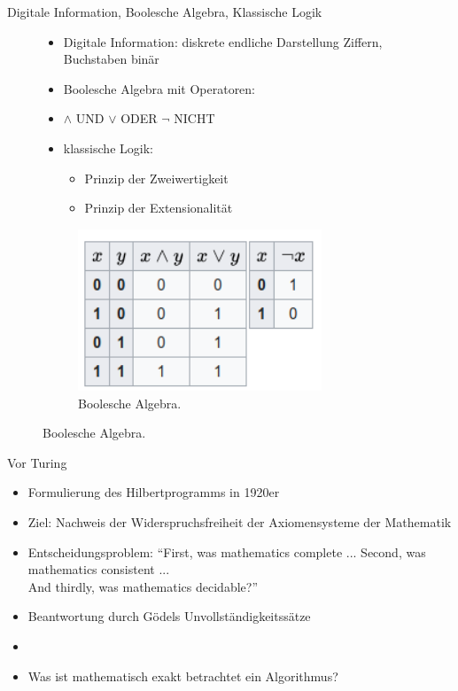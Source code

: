 \documentclass[aspectratio=1610, 9pt]{beamer}
\begin{document}
\begin{frame}{Digitale Information, Boolesche Algebra, Klassische Logik}
  \begin{figure}
    \begin{minipage}{0.7\textwidth}
      \begin{itemize}
        \item Digitale Information: diskrete endliche Darstellung \rightarrow Ziffern, Buchstaben \rightarrow binär
        \item Boolesche Algebra mit Operatoren:
        \item[] $\land$ UND $\lor$ ODER $\lnot$ NICHT
        \item klassische Logik:
        \begin{itemize}
          \item Prinzip der Zweiwertigkeit
          \item Prinzip der Extensionalität
        \end{itemize}
      \end{itemize}
    \end{minipage}
    \hfill
    \begin{minipage}{0.28\textwidth}
      \begin{figure}
        \includegraphics[width=0.8\textwidth]{images/bool.png}
        \caption{Boolesche Algebra.}
      \end{figure}
    \end{minipage}
  \end{figure}
\end{frame}

\begin{frame}{Vor Turing}
  \begin{itemize}
    \item Formulierung des Hilbertprogramms in 1920er
    \item Ziel: Nachweis der Widerspruchsfreiheit der Axiomensysteme der Mathematik
    \item[\rightarrow] Entscheidungsproblem: \enquote{First, was mathematics complete ... Second, was mathematics consistent ... \\ And thirdly, was mathematics decidable?}
    \item[\rightarrow] Beantwortung durch Gödels Unvollständigkeitssätze
    \item[]
    \item Was ist mathematisch exakt betrachtet ein Algorithmus?
  \end{itemize}

\end{frame}
\end{document}
